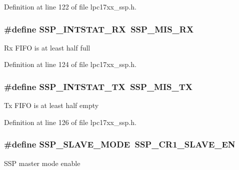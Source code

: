 \-Definition at line 122 of file lpc17xx\-\_\-ssp.\-h.

\hypertarget{group___s_s_p___public___macros_gacf36c76c863756c8bfda4057637cc034}{
\subsubsection[{\-S\-S\-P\-\_\-\-I\-N\-T\-S\-T\-A\-T\-\_\-\-R\-X}]{\setlength{\rightskip}{0pt plus 5cm}\#define {\bf \-S\-S\-P\-\_\-\-I\-N\-T\-S\-T\-A\-T\-\_\-\-R\-X}~{\bf \-S\-S\-P\-\_\-\-M\-I\-S\-\_\-\-R\-X}}}\label{group___s_s_p___public___macros_gacf36c76c863756c8bfda4057637cc034}
\-Rx \-F\-I\-F\-O is at least half full 

\-Definition at line 124 of file lpc17xx\-\_\-ssp.\-h.

\hypertarget{group___s_s_p___public___macros_ga76c22817987e49834f2280f48c7b3c64}{
\subsubsection[{\-S\-S\-P\-\_\-\-I\-N\-T\-S\-T\-A\-T\-\_\-\-T\-X}]{\setlength{\rightskip}{0pt plus 5cm}\#define {\bf \-S\-S\-P\-\_\-\-I\-N\-T\-S\-T\-A\-T\-\_\-\-T\-X}~{\bf \-S\-S\-P\-\_\-\-M\-I\-S\-\_\-\-T\-X}}}\label{group___s_s_p___public___macros_ga76c22817987e49834f2280f48c7b3c64}
\-Tx \-F\-I\-F\-O is at least half empty 

\-Definition at line 126 of file lpc17xx\-\_\-ssp.\-h.

\hypertarget{group___s_s_p___public___macros_gac6bc4b92810caa934b2d7116390098c6}{
\subsubsection[{\-S\-S\-P\-\_\-\-S\-L\-A\-V\-E\-\_\-\-M\-O\-D\-E}]{\setlength{\rightskip}{0pt plus 5cm}\#define {\bf \-S\-S\-P\-\_\-\-S\-L\-A\-V\-E\-\_\-\-M\-O\-D\-E}~{\bf \-S\-S\-P\-\_\-\-C\-R1\-\_\-\-S\-L\-A\-V\-E\-\_\-\-E\-N}}}\label{group___s_s_p___public___macros_gac6bc4b92810caa934b2d7116390098c6}
\-S\-S\-P master mode enable 

